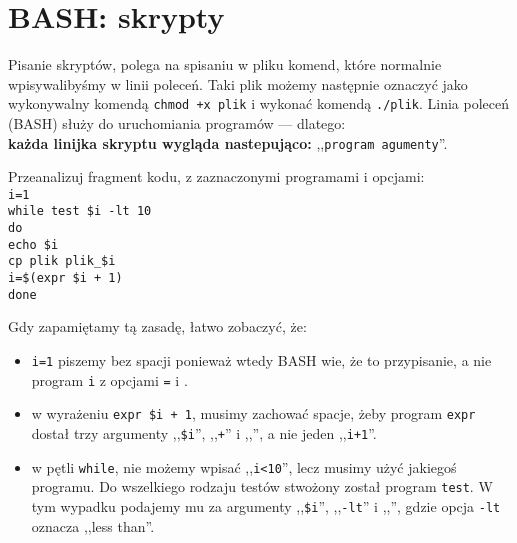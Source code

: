 \documentclass{instrukcja}
\begin{document}
\author{Ł. Łaniewski-Wołłk}
\materialtitle

\section{BASH: skrypty}
Pisanie skryptów, polega na spisaniu w pliku komend, które normalnie wpisywalibyśmy w linii poleceń. Taki plik możemy następnie oznaczyć jako wykonywalny komendą {\tt chmod +x plik} i wykonać komendą {\tt ./plik}. Linia poleceń (BASH) służy do uruchomiania programów --- dlatego:\\{\bf każda linijka skryptu wygląda nastepująco:} ,,{\tt {\red program} {\green agumenty}}''.

Przeanalizuj fragment kodu, z zaznaczonymi {\red programami} i {\green opcjami}:
{\tt\\
{\red i=1}\\
while {\red test} {\green \$i -lt 10}\\
do\\
{\red echo} {\green \$i}\\
{\red cp} {\green plik plik\_\$i}\\
{\red i=}\$({\red expr} {\green \$i + 1})\\
done\\
}

Gdy zapamiętamy tą zasadę, łatwo zobaczyć, że:
\begin{itemize}
\item {\tt\red i=1} piszemy bez spacji ponieważ wtedy BASH wie, że to przypisanie, a nie program {\tt\red i} z opcjami {\tt\green =} i {\tt{}}. 
\item w wyrażeniu {\tt {\red expr} {\green \$i + 1}}, musimy zachować spacje, żeby program {\tt\red expr} dostał trzy argumenty ,,{\tt\green\$i}'', ,,{\tt\green +}'' i ,,{\tt{}}'', a nie jeden ,,{\tt\green i+1}''.
\item w pętli {\tt while}, nie możemy wpisać ,,{\tt i<10}'', lecz musimy użyć jakiegoś programu. Do wszelkiego rodzaju testów stwożony został program {\tt\red test}. W tym wypadku podajemy mu za argumenty ,,{\tt\green\$i}'', ,,{\tt\green -lt}'' i ,,{\tt{}}'', gdzie opcja {\tt\green -lt} oznacza ,,less than''.
\end{itemize}
\end{document}
